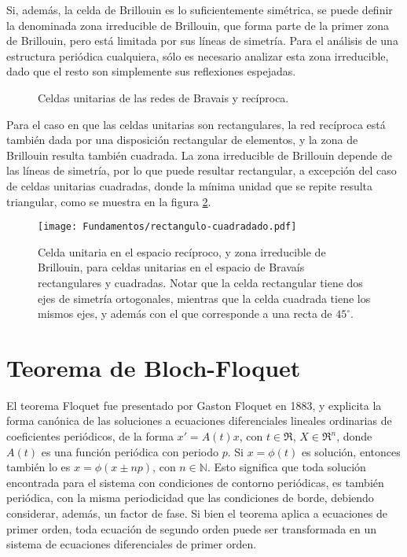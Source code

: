 Si, además, la celda de Brillouin es lo suficientemente simétrica, se puede definir la denominada zona irreducible de Brillouin, que forma parte de la primer zona de Brillouin, pero está limitada por sus líneas de simetría. Para el análisis de una estructura periódica cualquiera, sólo es necesario analizar esta zona irreducible, dado que el resto son simplemente sus reflexiones espejadas.

\begin{figure}[H]
	\centering 
	\hspace{0pt}
	\caption{Celdas unitarias de las redes de Bravais y recíproca.}
	\label{fig:celdas-unitarias}
\end{figure}

Para el caso en que las celdas unitarias son rectangulares, la red recíproca está también dada por una disposición rectangular de elementos, y la zona de Brillouin resulta también cuadrada. La zona irreducible de Brillouin depende de las líneas de simetría, por lo que puede resultar rectangular, a excepción del caso de celdas unitarias cuadradas, donde la mínima unidad que se repite resulta triangular, como se muestra en la figura \ref{fig:rectangulo-cuadrado}.

\begin{figure}[htp]
	\centering
	\texttt{[image: Fundamentos/rectangulo-cuadradado.pdf]}
	\caption{Celda unitaria en el espacio recíproco, y zona irreducible de Brillouin, para celdas unitarias en el espacio de Bravaís rectangulares y cuadradas. Notar que la celda rectangular tiene dos ejes de simetría ortogonales, mientras que la celda cuadrada tiene los mismos ejes, y además con el que corresponde a una recta de $45^{\circ}$.}
	\label{fig:rectangulo-cuadrado}
\end{figure}

\section{Teorema de Bloch-Floquet}

El teorema Floquet fue presentado por Gaston Floquet en 1883, y explicita la forma canónica de las soluciones a ecuaciones diferenciales lineales ordinarias de coeficientes periódicos, de la forma $x' = A(t)x$, con $t \in \Re$, $X \in \Re^n$, donde $A(t)$ es una función periódica con periodo $p$. Si $x=\phi(t)$ es solución, entonces también lo es $x=\phi(x\pm np)$, con $n \in \mathbb{N}$. Esto significa que toda solución encontrada para el sistema con condiciones de contorno periódicas, es también periódica, con la misma periodicidad que las condiciones de borde, debiendo considerar, además, un factor de fase. Si bien el teorema aplica a ecuaciones de primer orden, toda ecuación de segundo orden puede ser transformada en un sistema de ecuaciones diferenciales de primer orden.

